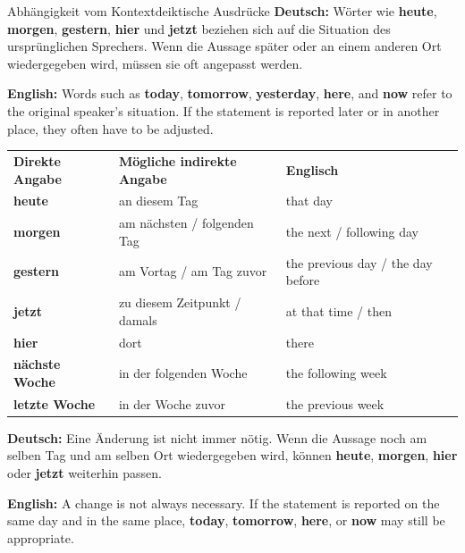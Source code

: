 \documentclass[a4paper,11pt]{article}
\newcommand{\GermanText}[1]{\textbf{Deutsch: }#1\par}
\newcommand{\EnglishText}[1]{{\small\color{SoftGray}\textbf{English: }#1\par}}
\begin{document}
        \begin{grammarentry}{Abhängigkeit vom Kontext}{deiktische Ausdrücke}
            \GermanText{Wörter wie \textbf{heute}, \textbf{morgen}, \textbf{gestern}, \textbf{hier} und \textbf{jetzt} beziehen sich auf die Situation des ursprünglichen Sprechers. Wenn die Aussage später oder an einem anderen Ort wiedergegeben wird, müssen sie oft angepasst werden.}
            \EnglishText{Words such as \textbf{today}, \textbf{tomorrow}, \textbf{yesterday}, \textbf{here}, and \textbf{now} refer to the original speaker's situation. If the statement is reported later or in another place, they often have to be adjusted.}
        \end{grammarentry}

        \begin{longtable}{>{\bfseries}p{3.2cm}|p{4.7cm}|p{5.9cm}}
            \rowcolor{HeaderBlueDark}
            \color{white}\textbf{Direkte Angabe} &
            \color{white}\textbf{Mögliche indirekte Angabe} &
            \color{white}\textbf{Englisch} \\
            heute & an diesem Tag & that day \\
            morgen & am nächsten / folgenden Tag & the next / following day \\
            gestern & am Vortag / am Tag zuvor & the previous day / the day before \\
            jetzt & zu diesem Zeitpunkt / damals & at that time / then \\
            hier & dort & there \\
            nächste Woche & in der folgenden Woche & the following week \\
            letzte Woche & in der Woche zuvor & the previous week \\
        \end{longtable}

        \begin{warningbox}
            \GermanText{Eine Änderung ist nicht immer nötig. Wenn die Aussage noch am selben Tag und am selben Ort wiedergegeben wird, können \textbf{heute}, \textbf{morgen}, \textbf{hier} oder \textbf{jetzt} weiterhin passen.}
            \EnglishText{A change is not always necessary. If the statement is reported on the same day and in the same place, \textbf{today}, \textbf{tomorrow}, \textbf{here}, or \textbf{now} may still be appropriate.}
        \end{warningbox}
\end{document}
